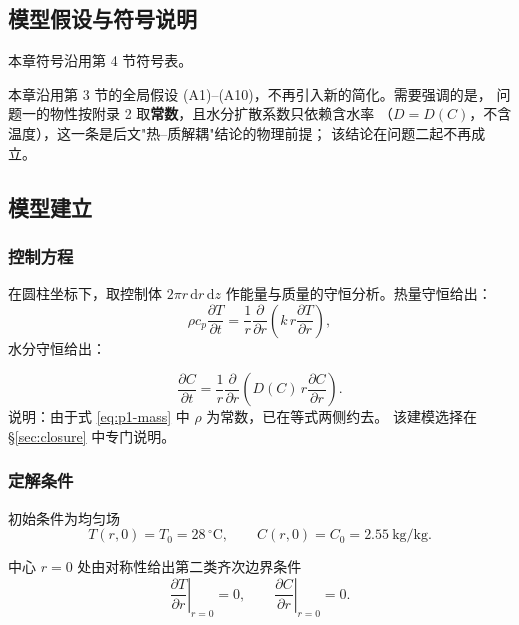 \documentclass[12pt,a4paper,fontset=none]{ctexart}
\begin{document}
\subsection{模型假设与符号说明}

本章符号沿用第 4 节符号表。

本章沿用第 3 节的全局假设 (A1)--(A10)，不再引入新的简化。需要强调的是，
问题一的物性按附录 2 取\textbf{常数}，且水分扩散系数只依赖含水率
（$D=D(C)$，不含温度），这一条是后文"热--质解耦"结论的物理前提；
该结论在问题二起不再成立。

\subsection{模型建立}

\subsubsection{控制方程}

在圆柱坐标下，取控制体
$2\pi r\,\mathrm{d}r\,\mathrm{d}z$ 作能量与质量的守恒分析。热量守恒给出：
\begin{equation}
  \rho c_p\frac{\partial T}{\partial t}
  =\frac{1}{r}\frac{\partial}{\partial r}
   \left(k\,r\frac{\partial T}{\partial r}\right),
  \label{eq:p1-heat}
\end{equation}
水分守恒给出：

\begin{equation}
  \frac{\partial C}{\partial t}
  =\frac{1}{r}\frac{\partial}{\partial r}
   \left(D(C)\,r\frac{\partial C}{\partial r}\right).
  \label{eq:p1-mass}
\end{equation}
说明：由于式 \eqref{eq:p1-mass} 中 $\rho$ 为常数，已在等式两侧约去。
该建模选择在 §\ref{sec:closure} 中专门说明。

\subsubsection{定解条件}

初始条件为均匀场
\begin{equation}
  T(r,0)=T_0=28\,^\circ\mathrm{C},\qquad
  C(r,0)=C_0=2.55\ \mathrm{kg/kg}.
  \label{eq:p1-ic}
\end{equation}

中心 $r=0$ 处由对称性给出第二类齐次边界条件
\begin{equation}
  \left.\frac{\partial T}{\partial r}\right|_{r=0}=0,\qquad
  \left.\frac{\partial C}{\partial r}\right|_{r=0}=0 .
  \label{eq:p1-center}
\end{equation}
\end{document}
